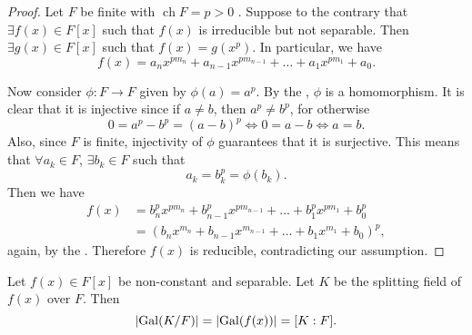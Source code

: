 \documentclass[notoc,notitlepage]{tufte-book}
\DeclareMathOperator{\Gal}{Gal}
\DeclareMathOperator{\ch}{ch}
\begin{document}
\begin{proof}
  Let $F$ be finite with $\ch F = p > 0$ . Suppose
  to the contrary that $\exists f(x) \in F[x]$ such that $f(x)$ is irreducible
  but not separable. Then $\exists g(x) \in F[x]$ such that $f(x) = g(x^p)$. In
  particular, we have
  \begin{equation*}
    f(x) = a_n x^{p m_n} + a_{n - 1} x^{p m_{n - 1}} + \hdots + a_1 x^{p m_1} +
    a_0.
  \end{equation*}

  Now consider $\phi : F \to F$ given by $\phi(a) = a^p$. By the
  , $\phi$ is a homomorphism. It is clear that it is
  injective since if $a \neq b$, then $a^p \neq b^p$, for otherwise
  \begin{equation*}
    0 = a^p - b^p = (a - b)^p \iff 0 = a - b \iff a = b.
  \end{equation*}
  Also, since $F$ is finite, injectivity of $\phi$ guarantees that it is
  surjective. This means that $\forall a_k \in F$, $\exists b_k \in F$ such that
  \begin{equation*}
    a_k = b_k^p = \phi(b_k).
  \end{equation*}
  Then we have
  \begin{align*}
    f(x) &= b_n^p x^{p m_n} + b_{n - 1}^p x^{p m_{n - 1}} + \hdots + b_1^p x^{p
          m_1} + b_0^p \\
         &= ( b_n x^{m_n} + b_{n - 1} x^{m_{n - 1}} + \hdots + b_1 x^{m_1} + b_0
          )^p,
  \end{align*}
  again, by the . Therefore $f(x)$ is reducible,
  contradicting our assumption.
\end{proof}

\begin{thm}\label{thm:galois_group_of_a_splitting_field_of_a_separable_polynomial_has_order_the_degree_of_the_extension}
  Let $f(x) \in F[x]$ be non-constant and separable. Let $K$ be the splitting
  field of $f(x)$ over $F$. Then
  \begin{equation*}
    \abs{ \Gal(K / F) } = \abs{ \Gal(f(x)) } = [ K : F ].
  \end{equation*}
\end{thm}
\end{document}
